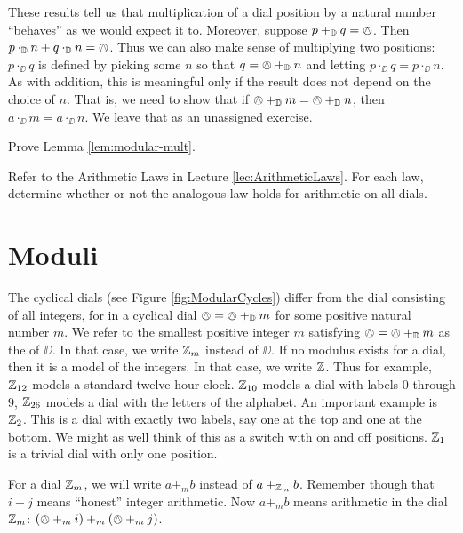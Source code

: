 These results tell us that multiplication of a dial position by a natural number ``behaves'' as we would expect it to. 
Moreover, suppose $p+_{\mathbb D} q = \owedge$. 
Then $p\cdot_{\mathbb D} n + q\cdot_{\mathbb D} n=\owedge$.
Thus we can also make sense of multiplying two positions:
$p\cdot_\DD q$ is defined by picking some $n$ so that $q = \owedge +_{\mathbb D} n$ and letting $p\cdot_\DD q = p\cdot_\DD n$.
As with addition, this is meaningful only if the result does not depend on the choice of $n$.
That is, we need to show that if $\owedge +_{\mathbb D} m = \owedge +_{\mathbb D} n$, then $a\cdot_\DD m = a\cdot_\DD n$.
We leave that as an unassigned exercise.

\begin{exer}
	\begin{exercise}
		\item Prove Lemma \ref{lem:modular-mult}.
		\item Refer to the Arithmetic Laws in Lecture \ref{lec:ArithmeticLaws}. For each law, determine whether or not the analogous law holds for arithmetic on all dials.
	\end{exercise}
\end{exer}


\section*{Moduli}

The cyclical dials (see Figure \ref{fig:ModularCycles}) differ from the dial consisting of all integers, for in a cyclical dial $\owedge = \owedge +_{\mathbb D} m$ for some positive natural number $m$. 
We refer to the smallest positive integer $m$ satisfying $\owedge = \owedge +_{\mathbb D} m$ as the  of $\DD$. In that case, we write ${\mathbb Z}_m$ instead of $\DD$. If no modulus exists for a dial, then it is a model of the integers. In that case, we write ${\mathbb Z}$. 
Thus for example, ${\mathbb Z}_{12}$ models a standard twelve hour clock. ${\mathbb Z}_{10}$ models a dial with labels $0$ through $9$, ${\mathbb Z}_{26}$ models a dial with the letters of the alphabet. An important example is ${\mathbb Z}_2$. This is a dial with exactly two labels, say one at the top and one at the bottom. We might as well think of this as a switch with on and off positions. ${\mathbb Z}_1$ is a trivial dial with only one position.

For a dial ${\mathbb Z}_m$, we will write $a +_m b$ instead of $a +_{{\mathbb Z}_m} b$. Remember though that $i+j$ means ``honest'' integer arithmetic. Now $a +_m b$ means arithmetic in the dial ${\mathbb Z}_m$: $(\owedge +_m i)+_m(\owedge +_m j)$. 

